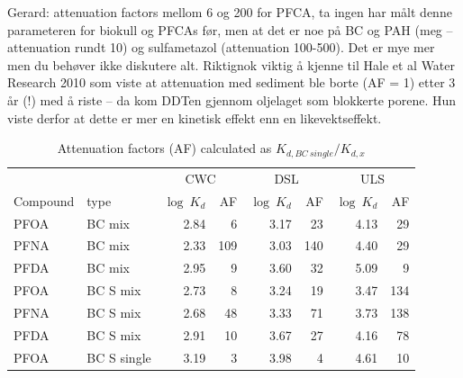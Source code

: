 Gerard:
    attenuation factors mellom 6 og 200 for PFCA, ta ingen har målt denne parameteren for biokull og PFCAs før, men at det er noe på BC og PAH (meg – attenuation rundt 10) og sulfametazol (attenuation 100-500). Det er mye mer men du behøver ikke diskutere alt. Riktignok viktig å kjenne til Hale et al Water Research 2010 som viste at attenuation med sediment ble borte (AF = 1) etter 3 år (!) med å riste – da kom DDTen gjennom oljelaget som blokkerte porene. Hun viste derfor at dette er mer en kinetisk effekt enn en likevektseffekt. 

\begin{table}
\centering
\caption{Attenuation factors (AF) calculated as $K_{d,BC~single}/K_{d,x}$}
\label{tab:attenuation}
\begin{tabular}{llrrrrrr} \toprule
 &  & \multicolumn{2}{c}{CWC} & \multicolumn{2}{c}{DSL} & \multicolumn{2}{c}{ULS} \\ \cmidrule(l){3-4} \cmidrule(l){5-6} \cmidrule(l){7-8}
Compound & type & $\log~K_d$ & AF & $\log~K_d$ & AF & $\log~K_d$ & AF \\ \midrule
PFOA & BC mix & 2.84 & 6 & 3.17 & 23 & 4.13 & 29 \\
PFNA & BC mix & 2.33 & 109 & 3.03 & 140 & 4.40 & 29 \\
PFDA & BC mix & 2.95 & 9 & 3.60 & 32 & 5.09 & 9 \\ \addlinespace \hline \addlinespace
PFOA & BC S mix & 2.73 & 8 & 3.24 & 19 & 3.47 & 134 \\
PFNA & BC S mix & 2.68 & 48 & 3.33 & 71 & 3.73 & 138 \\
PFDA & BC S mix & 2.91 & 10 & 3.67 & 27 & 4.16 & 78 \\ \addlinespace \hline \addlinespace
PFOA & BC S single & 3.19 & 3 & 3.98 & 4 & 4.61 & 10 \\ \bottomrule
\end{tabular}
\end{table}



